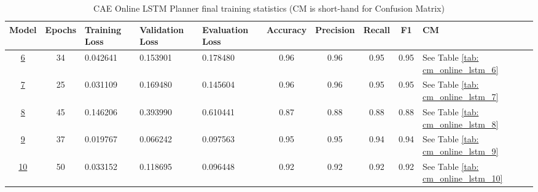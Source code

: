 \begin{table}[h!]
    \footnotesize
    \centerfloat
    \begin{tabular}{|c|c|M{1.3cm}|M{1.5cm}|M{1.5cm}|c|c|c|c|M{0.7cm}|}
         \hline
         \textbf{Model} & \textbf{Epochs} & \textbf{Training Loss} & \textbf{Validation Loss} & \textbf{Evaluation Loss} & \textbf{Accuracy} & \textbf{Precision} & \textbf{Recall} & \textbf{F1} & \textbf{CM} \\
         \hline
         \hyperref[tab: evalalgorithms]{6} & 34 & 0.042641 & 0.153901 & 0.178480 & 0.96 & 0.96 & 0.95 & 0.95 & See Table \ref{tab: cm_online_lstm_6} \\
         \hline
         \hyperref[tab: evalalgorithms]{7} & 25 & 0.031109 & 0.169480 & 0.145604 & 0.96 & 0.96  & 0.95 & 0.95 & See Table \ref{tab: cm_online_lstm_7} \\
         \hline
         \hyperref[tab: evalalgorithms]{8} & 45 & 0.146206 & 0.393990 & 0.610441 & 0.87 & 0.88 & 0.88 & 0.88 & See Table \ref{tab: cm_online_lstm_8} \\
         \hline
         \hyperref[tab: evalalgorithms]{9} & 37 & 0.019767 & 0.066242 & 0.097563 & 0.95 & 0.95 & 0.94 & 0.94 & See Table \ref{tab: cm_online_lstm_9} \\
         \hline
         \hyperref[tab: evalalgorithms]{10} & 50 & 0.033152 & 0.118695 & 0.096448 & 0.92 & 0.92 & 0.92 & 0.92 & See Table \ref{tab: cm_online_lstm_10} \\
         \hline
    \end{tabular}
    \caption{CAE Online LSTM Planner final training statistics (CM is short-hand for Confusion Matrix)}
    \label{tab: cae_online_lstm_final_tr_res}
\end{table}


